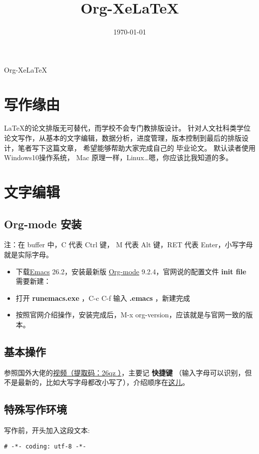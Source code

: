 \documentclass{ctexrep}
\date{\today}
\title{Org-XeLaTeX}
\begin{document}
Org-XeLaTeX
\tableofcontents


\section{写作缘由}
\label{sec:org1aedec9}
\LaTeX 的论文排版无可替代，而学校不会专门教排版设计。
针对人文社科类学位论文写作，从基本的文字编辑，数据分析，进度管理，版本控制到最后的排版设计，笔者写下这篇文章，
希望能够帮助大家完成自己的
毕业论文。
默认读者使用 \faWindows  Windows10操作系统，
\faApple  Mac 原理一样，Linux\ldots{}\faLinux 嗯，你应该比我知道的多。
\section{文字编辑}
\label{sec:org1ca4665}
\subsection{Org-mode 安装}
\label{sec:orgd10aa6f}
注：在 buffer 中，C 代表 Ctrl 键， M 代表 Alt 键，RET 代表 Enter，小写字母就是实际字母。

\begin{itemize}
\item 下载\href{https://www.gnu.org/software/emacs/download.html}{Emacs} 26.2，安装最新版 \href{https://orgmode.org/elpa.html}{Org-mode} 9.2.4，官网说的配置文件 \textbf{init file} 需要新建：
\item 打开 \textbf{runemacs.exe} ，C-c C-f 输入 \textbf{.emacs} ，新建完成
\item 按照官网介绍操作，安装完成后，M-x org-version，应该就是与官网一致的版本。
\end{itemize}
\subsection{基本操作}
\label{sec:org8545fea}
参照国外大佬的\href{https://pan.baidu.com/s/1p6CRrnt6c0WrROvLW0BjRA }{视频（提取码：26qz ）}，主要记 \textbf{快捷键} （输入字母可以识别，但不是最新的，比如大写字母都改小写了），介绍顺序在\href{https://orgmode.org/worg/org-tutorials/org-screencasts/org-mode-google-tech-talk.html}{这儿}。
\subsection{特殊写作环境}
\label{sec:org496d5a9}
写作前，开头加入这段文本:

\begin{verbatim}
# -*- coding: utf-8 -*-
\end{verbatim}
\end{document}
